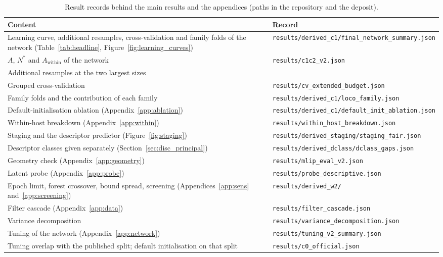 \begin{table}[H]
\caption{Result records behind the main results and the appendices (paths in the repository and the deposit).\label{tab:app_records}}
\centering
\small
\begin{tabularx}{\linewidth}{>{\raggedright\arraybackslash}Xl}
\toprule
Content & Record \\
\midrule
Learning curve, additional resamples, cross-validation and family folds of the network (Table~\ref{tab:headline}, Figure~\ref{fig:learning_curves}) & \texttt{results/derived\_c1/final\_network\_summary.json} \\
$A$, $N^{*}$ and $A_\mathrm{within}$ of the network & \texttt{results/c1c2\_v2.json} \\
Additional resamples at the two largest sizes & \recprecision{} \\
Grouped cross-validation & \texttt{results/cv\_extended\_budget.json} \\
Family folds and the contribution of each family & \texttt{results/derived\_c1/loco\_family.json} \\
Default-initialisation ablation (Appendix~\ref{app:ablation}) & \texttt{results/derived\_c1/default\_init\_ablation.json} \\
Within-host breakdown (Appendix~\ref{app:within}) & \texttt{results/within\_host\_breakdown.json} \\
Staging and the descriptor predictor (Figure~\ref{fig:staging}) & \texttt{results/derived\_staging/staging\_fair.json} \\
Descriptor classes given separately (Section~\ref{sec:disc_principal}) & \texttt{results/derived\_dclass/dclass\_gaps.json} \\
Geometry check (Appendix~\ref{app:geometry}) & \texttt{results/mlip\_eval\_v2.json} \\
Latent probe (Appendix~\ref{app:probe}) & \texttt{results/probe\_descriptive.json} \\
Epoch limit, forest crossover, bound spread, screening (Appendices~\ref{app:sens} and~\ref{app:screening}) & \texttt{results/derived\_w2/} \\
Filter cascade (Appendix~\ref{app:data}) & \texttt{results/filter\_cascade.json} \\
Variance decomposition & \texttt{results/variance\_decomposition.json} \\
Tuning of the network (Appendix~\ref{app:network}) & \texttt{results/tuning\_v2\_summary.json} \\
Tuning overlap with the published split; default initialisation on that split & \texttt{results/c0\_official.json} \\
\bottomrule
\end{tabularx}
\end{table}


